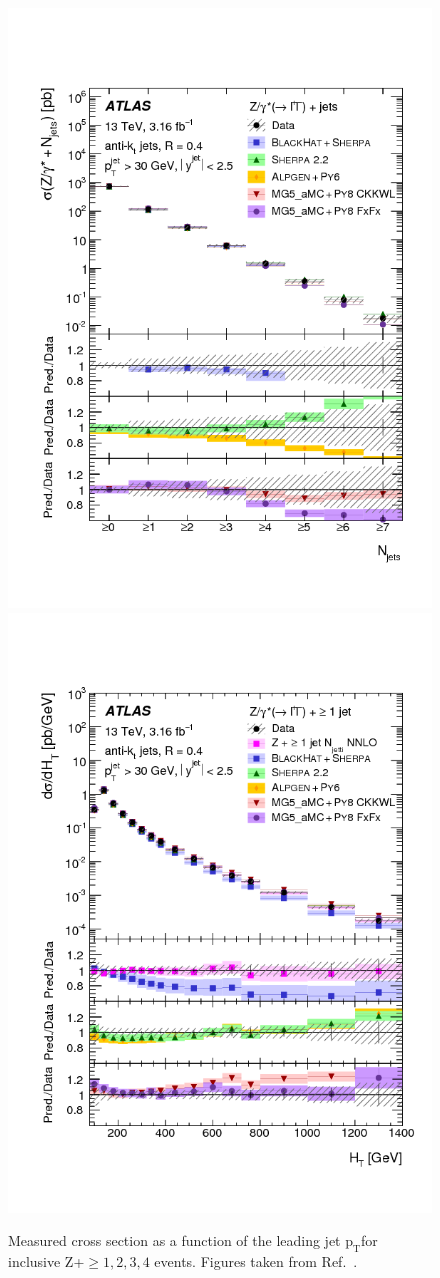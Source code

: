 \documentclass[a4paper,11pt,notoc]{article}
\newcommand{\pt}{\ensuremath{\mathrm{p_T}}}
\begin{document}
\begin{figure}[t!]
\centering
\includegraphics[width=0.495\columnwidth]{figures_results_comb_hJetNTin.png} 
\includegraphics[width=0.495\columnwidth]{figures_results_comb_hHT1jT.png}
\caption{Measured cross section as a function of the leading jet \pt for inclusive Z+$\ge 1,2,3,4$ events. Figures taken from Ref.~\cite{Aaboud:2017hbk}.}
\label{ATLASZpt}
\end{figure}   
\end{document}
